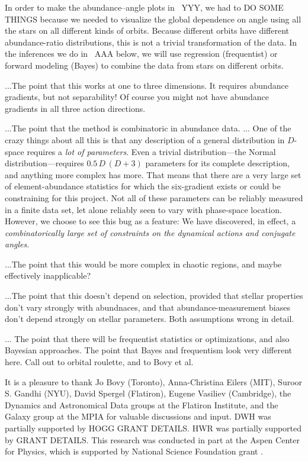 \documentclass[modern]{aastex63}
\begin{document}
In order to make the abundance--angle plots in \figurename~YYY, we had
to DO SOME THINGS because we needed to visualize the global dependence
on angle using all the stars on all different kinds of orbits.
Because different orbits have different abundance-ratio
distributions, this is not a trivial transformation of the data.
In the inferences we do in \sectionname~AAA below, we
will use regression (frequentist) or forward modeling (Bayes) to
combine the data from stars on different orbits.

...The point that this works at one to three dimensions. It requires
abundance gradients, but not separability!  Of course you might not
have abundance gradients in all three action directions.

...The point that the method is combinatoric in abundance data.
...
One of the crazy things about all this is that any description of a general distribution in $D$-space
requires a \emph{lot of parameters}.
Even a trivial distribution---the Normal distribution---requires $0.5\,D\,(D+3)$ parameters for its
complete description, and anything more complex has more.
That means that there are a very large set of element-abundance statistics for which the
six-gradient exists or could be constraining for this project.
Not all of these parameters can be reliably measured in a finite data set,
let alone reliably seen to vary with phase-space location.
However, we choose to see this bug as a feature:
We have discovered, in effect, a \emph{combinatorically large set of constraints on the
dynamical actions and conjugate angles}.

...The point that this would be more complex in chaotic regions, and
maybe effectively inapplicable?

...The point that this doesn't depend on selection, provided that
stellar properties don't vary strongly with abundnaces, and that
abundance-measurement biases don't depend strongly on stellar
parameters. Both assumptions wrong in detail.

... The point that there will be frequentist statistics or
optimizations, and also Bayesian approaches.  The point that Bayes and
frequentism look very different here. Call out to orbital roulette,
and to Bovy et al.

\acknowledgments
It is a pleasure to thank
  Jo Bovy (Toronto),
  Anna-Christina Eilers (MIT),
  Suroor S. Gandhi (NYU),
  David Spergel (Flatiron),
  Eugene Vasiliev (Cambridge),
  the Dynamics and Astronomical Data groups at the Flatiron Institute,
  and the Galaxy group at the MPIA
for valuable discussions and input.
DWH was partially supported by HOGG GRANT DETAILS.
HWR was partially supported by GRANT DETAILS.
This research was conducted in part at the Aspen Center for Physics,
which is supported by National Science Foundation grant .
\end{document}
